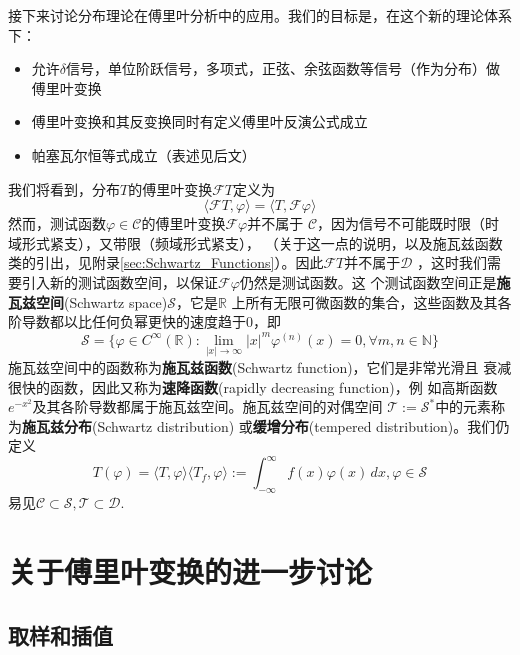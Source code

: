 \documentclass{ctexbook}
\begin{document}
接下来讨论分布理论在傅里叶分析中的应用。我们的目标是，在这个新的理论体系下：
\begin{itemize}
    \item 允许$\delta$信号，单位阶跃信号，多项式，正弦、余弦函数等信号（作为分布）做傅里叶变换
    \item 傅里叶变换和其反变换同时有定义傅里叶反演公式成立
    \item 帕塞瓦尔恒等式成立（表述见后文）
\end{itemize}
我们将看到，分布$T$的傅里叶变换$\mathcal{F} T$定义为
\begin{equation}
    \langle\mathcal{F}T,\varphi\rangle=\langle T,\mathcal{F}\varphi\rangle
\end{equation}
然而，测试函数$\varphi\in\mathcal{C} $的傅里叶变换$\mathcal{F}\varphi$并不属于
$\mathcal{C} $，因为信号不可能既时限（时域形式紧支），又带限（频域形式紧支），
（关于这一点的说明，以及施瓦兹函数类的引出，见附录\ref{sec:Schwartz_Functions}）。因此$\mathcal{F} T$并不属于$\mathcal{D} $
，这时我们需要引入新的测试函数空间，以保证$\mathcal{F}\varphi$仍然是测试函数。这
个测试函数空间正是\textbf{施瓦兹空间}(Schwartz space)$\mathcal{S} $，它是$\mathbb{R}$
上所有无限可微函数的集合，这些函数及其各阶导数都以比任何负幂更快的速度趋于0，即
\[\mathcal{S} =\{\varphi\in C^{\infty}(\mathbb{R} ):\lim_{|x|\to\infty}|x|^m\varphi^{(n)}(x)=0,\forall m,n\in\mathbb{N} \}\]
施瓦兹空间中的函数称为\textbf{施瓦兹函数}(Schwartz function)，它们是非常光滑且
衰减很快的函数，因此又称为\textbf{速降函数}(rapidly decreasing function)，例
如高斯函数$e^{-x^2}$及其各阶导数都属于施瓦兹空间。施瓦兹空间的对偶空间
$\mathcal{T} :=\mathcal{S}^*$中的元素称为\textbf{施瓦兹分布}(Schwartz distribution)
或\textbf{缓增分布}(tempered distribution)。我们仍定义
\begin{equation}
    T(\varphi)=\langle T,\varphi\rangle
    \langle T_f,\varphi\rangle:=\int_{-\infty}^{\infty}f(x)\varphi(x)\,dx,\varphi\in\mathcal{S}
\end{equation}
易见$\mathcal{C} \subset \mathcal{S} ,\mathcal{T} \subset\mathcal{D}. $

\chapter{关于傅里叶变换的进一步讨论}

\section{取样和插值}\label{sec:Sampling and Interpolation}
\end{document}
